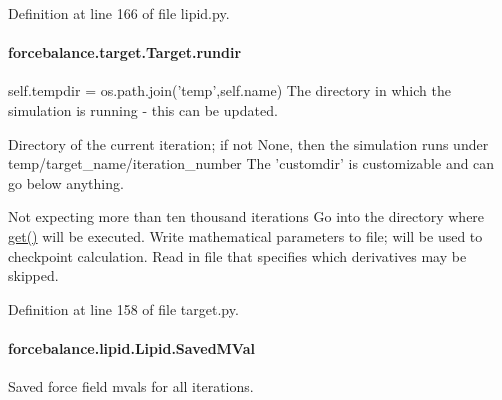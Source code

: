 Definition at line 166 of file lipid.\-py.

\hypertarget{classforcebalance_1_1target_1_1Target_a6872de5b2d4273b82336ea5b0da29c9e}{
\paragraph[{rundir}]{\setlength{\rightskip}{0pt plus 5cm}forcebalance.\-target.\-Target.\-rundir\hspace{0.3cm}{\ttfamily [inherited]}}}\label{classforcebalance_1_1target_1_1Target_a6872de5b2d4273b82336ea5b0da29c9e}


self.\-tempdir = os.\-path.\-join('temp',self.\-name) The directory in which the simulation is running -\/ this can be updated. 

Directory of the current iteration; if not None, then the simulation runs under temp/target\-\_\-name/iteration\-\_\-number The 'customdir' is customizable and can go below anything.

Not expecting more than ten thousand iterations Go into the directory where \hyperlink{classforcebalance_1_1target_1_1Target_a1389888302c49d529716cb45b13a6f5a}{get()} will be executed. Write mathematical parameters to file; will be used to checkpoint calculation. Read in file that specifies which derivatives may be skipped. 

Definition at line 158 of file target.\-py.

\hypertarget{classforcebalance_1_1lipid_1_1Lipid_a07e86c96c0045df320ffde881315fec3}{
\paragraph[{Saved\-M\-Val}]{\setlength{\rightskip}{0pt plus 5cm}forcebalance.\-lipid.\-Lipid.\-Saved\-M\-Val\hspace{0.3cm}{\ttfamily [inherited]}}}\label{classforcebalance_1_1lipid_1_1Lipid_a07e86c96c0045df320ffde881315fec3}


Saved force field mvals for all iterations. 



